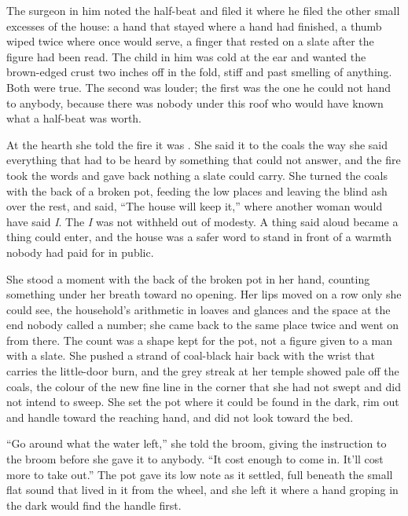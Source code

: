 The surgeon in him noted the half-beat and filed it where he filed the other small excesses of the house: a hand that stayed where a hand had finished, a thumb wiped twice where once would serve, a finger that rested on a slate after the figure had been read. The child in him was cold at the ear and wanted the brown-edged crust two inches off in the fold, stiff and past smelling of anything. Both were true. The second was louder; the first was the one he could not hand to anybody, because there was nobody under this roof who would have known what a half-beat was worth.

\scenebreak

At the hearth she told the fire it was . She said it to the coals the way she said everything that had to be heard by something that could not answer, and the fire took the words and gave back nothing a slate could carry. She turned the coals with the back of a broken pot, feeding the low places and leaving the blind ash over the rest, and said, “The house will keep it,” where another woman would have said \emph{I}. The \emph{I} was not withheld out of modesty. A thing said aloud became a thing  could enter, and the house was a safer word to stand in front of a warmth nobody had paid for in public.

She stood a moment with the back of the broken pot in her hand, counting something under her breath toward no opening. Her lips moved on a row only she could see, the household's arithmetic in loaves and glances and the space at the end nobody called a number; she came back to the same place twice and went on from there. The count was a shape kept for the pot, not a figure given to a man with a slate. She pushed a strand of coal-black hair back with the wrist that carries the little-door burn, and the grey streak at her temple showed pale off the coals, the colour of the new fine line in the corner that she had not swept and did not intend to sweep. She set the pot where it could be found in the dark, rim out and handle toward the reaching hand, and did not look toward the bed.

“Go around what the water left,” she told the broom, giving the instruction to the broom before she gave it to anybody. “It cost enough to come in. It'll cost more to take out.” The pot gave its low note as it settled, full beneath the small flat sound that lived in it from the wheel, and she left it where a hand groping in the dark would find the handle first.

